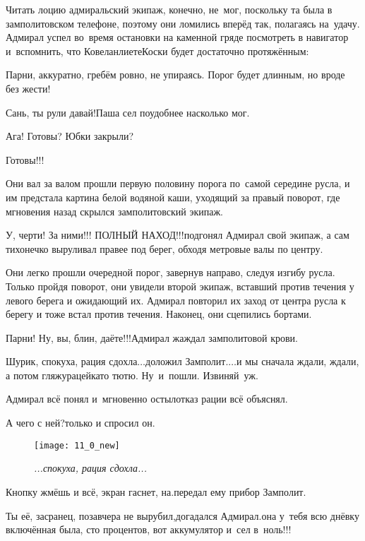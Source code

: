 Читать лоцию адмиральский экипаж, конечно, не~мог, поскольку та была в замполитовском телефоне, поэтому они ломились вперёд так, полагаясь на~удачу. Адмирал успел во~время остановки на каменной гряде посмотреть в навигатор и~вспомнить, что Ковеланлиете\sdash Коски будет достаточно протяжённым:

\diagdash Парни, аккуратно, гребём ровно, не упираясь. Порог будет длинным, но вроде без жести!

\diagdash Сань, ты рули давай!\mdash Паша сел поудобнее насколько мог.

\diagdash Ага! Готовы? Юбки закрыли?

\diagdash Готовы!!!

Они вал за валом прошли первую половину порога по~самой середине русла, и им предстала картина белой водяной каши, уходящий за правый поворот, где мгновения назад скрылся замполитовский экипаж.

\diagdash У, черти! За ними!!! {\large ПОЛНЫЙ НАХОД!!!}\mdash подгонял Адмирал свой экипаж, а сам тихонечко выруливал правее под берег, обходя метровые валы по центру. 

Они легко прошли очередной порог, завернув направо, следуя изгибу русла. Только пройдя поворот, они увидели второй экипаж, вставший против течения у левого берега и ожидающий их. Адмирал повторил их заход от центра русла к берегу и тоже встал против течения. Наконец, они сцепились бортами.

\diagdash Парни! Ну, вы, блин, даёте!!!\mdash Адмирал жаждал замполитовой крови.

\diagdash Шурик, спокуха, рация сдохла$\ldots$\mdash доложил Замполит.\mdash$\ldots$и мы сначала ждали, ждали, а потом гляжу\mdash рацейка\sdash то тю\sdash тю. Ну~и~пошли. Извиняй~уж.

Адмирал всё понял и~мгновенно остыл\mdash отказ рации всё объяснял.

\diagdash А чего с ней?\mdash только и спросил он.

\begin{wrapfigure}[12]{r}{0.48\textwidth}
	\centering
	\texttt{[image: 11\_0\_new]}
	\caption{\small\textit{...спокуха, рация сдохла...}}
\end{wrapfigure}

\diagdash Кнопку жмёшь и всё, экран гаснет, на.\mdash передал ему прибор Замполит.

\diagdash Ты её, засранец, позавчера не вырубил,\mdash догадался Адмирал.\mdash она у~тебя всю днёвку включённая была, сто процентов, вот аккумулятор и~сел в~ноль!!!

